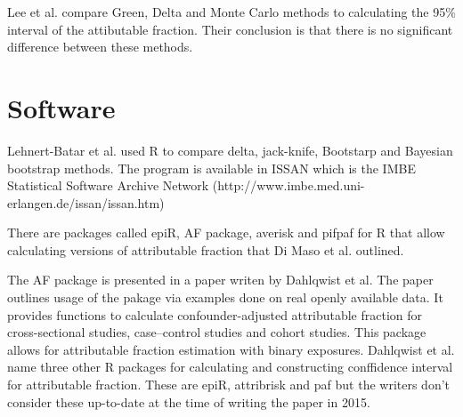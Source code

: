 Lee et al. compare Green, Delta and Monte Carlo methods to calculating the 95\% interval of the attibutable fraction. Their conclusion is that there is no significant difference between these methods.\cite{Lee2024ACO}

\section{Software}
Lehnert-Batar et al. used R to compare delta, jack-knife, Bootstarp and Bayesian bootstrap methods. The program is available in ISSAN which is the IMBE Statistical Software Archive Network (http://www.imbe.med.uni-erlangen.de/issan/issan.htm)\cite{LehnertBatar2006ComparisonOC}

There are packages called epiR, AF package, averisk and pifpaf for R that allow calculating versions of attributable fraction that Di Maso et al. outlined. \cite{DiMaso2020AttributableFF}

The AF package is presented in a paper writen by Dahlqwist et al. The paper outlines usage of the pakage via examples done on real openly available data. It provides functions to calculate confounder-adjusted attributable fraction for cross-sectional studies, case–control studies and cohort studies. This package allows for attributable fraction estimation with binary exposures. Dahlqwist et al. name three other R packages for calculating and constructing conffidence interval for attributable fraction. These are epiR, attribrisk and paf but the writers don't consider these up-to-date at the time of writing the paper in 2015.\cite{Dahlqwist2016ModelbasedEO} 